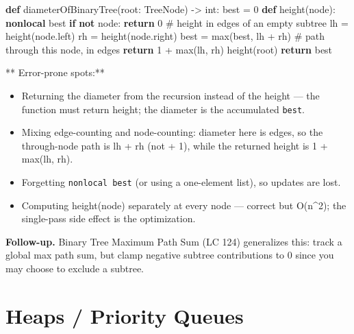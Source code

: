 \documentclass[11pt]{article}
\providecommand{\tightlist}{\setlength{\itemsep}{1pt}\setlength{\parskip}{0pt}}
\newenvironment{Shaded}{\begin{snugshade}}{\end{snugshade}}
\newcommand{\BuiltInTok}[1]{\textcolor[rgb]{0.50,0.55,0.55}{#1}}
\newcommand{\CommentTok}[1]{\textcolor[rgb]{0.48,0.49,0.49}{#1}}
\newcommand{\ControlFlowTok}[1]{\textcolor[rgb]{0.99,0.74,0.29}{\textbf{#1}}}
\newcommand{\DecValTok}[1]{\textcolor[rgb]{0.96,0.45,0.00}{#1}}
\newcommand{\KeywordTok}[1]{\textcolor[rgb]{0.81,0.81,0.76}{\textbf{#1}}}
\newcommand{\NormalTok}[1]{\textcolor[rgb]{0.81,0.81,0.76}{#1}}
\newcommand{\OperatorTok}[1]{\textcolor[rgb]{0.81,0.81,0.76}{#1}}
\begin{document}
\begin{Shaded}
\begin{Highlighting}[]
\KeywordTok{def}\NormalTok{ diameterOfBinaryTree(root: TreeNode) }\OperatorTok{{-}\textgreater{}} \BuiltInTok{int}\NormalTok{:}
\NormalTok{    best }\OperatorTok{=} \DecValTok{0}
    \KeywordTok{def}\NormalTok{ height(node):}
        \KeywordTok{nonlocal}\NormalTok{ best}
        \ControlFlowTok{if} \KeywordTok{not}\NormalTok{ node:}
            \ControlFlowTok{return} \DecValTok{0}               \CommentTok{\# height in edges of an empty subtree}
\NormalTok{        lh }\OperatorTok{=}\NormalTok{ height(node.left)}
\NormalTok{        rh }\OperatorTok{=}\NormalTok{ height(node.right)}
\NormalTok{        best }\OperatorTok{=} \BuiltInTok{max}\NormalTok{(best, lh }\OperatorTok{+}\NormalTok{ rh)  }\CommentTok{\# path through this node, in edges}
        \ControlFlowTok{return} \DecValTok{1} \OperatorTok{+} \BuiltInTok{max}\NormalTok{(lh, rh)}
\NormalTok{    height(root)}
    \ControlFlowTok{return}\NormalTok{ best}
\end{Highlighting}
\end{Shaded}

** Error-prone spots:**

\begin{itemize}
\tightlist
\item
  Returning the diameter from the recursion instead of the height --- the function must return height; the diameter is the accumulated \texttt{best}.
\item
  Mixing edge-counting and node-counting: diameter here is edges, so the through-node path is lh + rh (not + 1), while the returned height is 1 + max(lh, rh).
\item
  Forgetting \texttt{nonlocal\ best} (or using a one-element list), so updates are lost.
\item
  Computing height(node) separately at every node --- correct but O(n\^{}2); the single-pass side effect is the optimization.
\end{itemize}

\textbf{Follow-up.} Binary Tree Maximum Path Sum (LC 124) generalizes this: track a global max path sum, but clamp negative subtree contributions to 0 since you may choose to exclude a subtree.

\section{Heaps / Priority Queues}\label{heaps--priority-queues}
\end{document}
